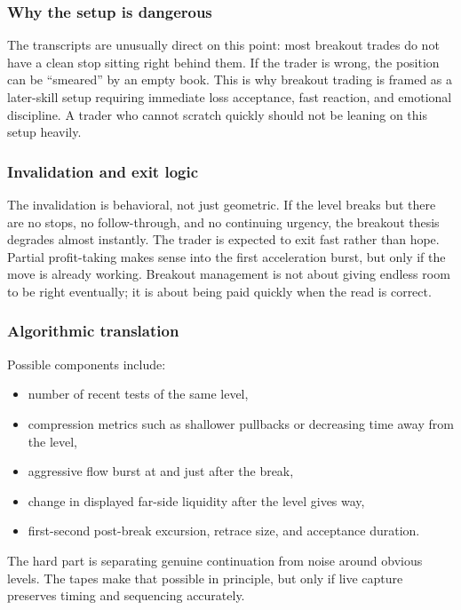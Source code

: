 \subsubsection{Why the setup is dangerous}

The transcripts are unusually direct on this point: most breakout trades do not have a clean
stop sitting right behind them. If the trader is wrong, the position can be ``smeared'' by an
empty book. This is why breakout trading is framed as a later-skill setup requiring immediate
loss acceptance, fast reaction, and emotional discipline. A trader who cannot scratch quickly
should not be leaning on this setup heavily.

\subsubsection{Invalidation and exit logic}

The invalidation is behavioral, not just geometric. If the level breaks but there are no stops,
no follow-through, and no continuing urgency, the breakout thesis degrades almost instantly.
The trader is expected to exit fast rather than hope. Partial profit-taking makes sense into the
first acceleration burst, but only if the move is already working. Breakout management is not
about giving endless room to be right eventually; it is about being paid quickly when the read
is correct.

\subsubsection{Algorithmic translation}

Possible components include:

\begin{itemize}[leftmargin=1.4em]
  \item number of recent tests of the same level,
  \item compression metrics such as shallower pullbacks or decreasing time away from the level,
  \item aggressive flow burst at and just after the break,
  \item change in displayed far-side liquidity after the level gives way,
  \item first-second post-break excursion, retrace size, and acceptance duration.
\end{itemize}

The hard part is separating genuine continuation from noise around obvious levels. The tapes
make that possible in principle, but only if live capture preserves timing and sequencing
accurately.

